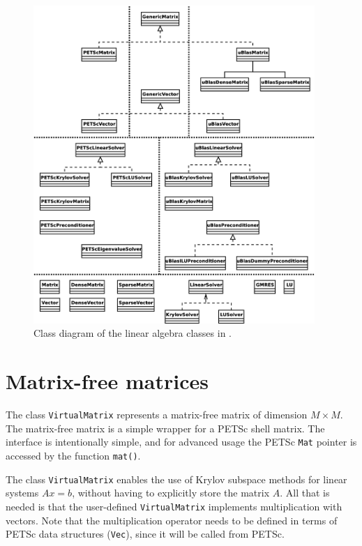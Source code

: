 \begin{figure}
  \begin{center}
    \includegraphics[width=0.95\textwidth]{eps/class-diagram-la.eps}
    \caption{Class diagram of the linear algebra classes in \dolfin{}.}
    \label{fig:laclasses}
  \end{center}
\end{figure}

\section{Matrix-free matrices}

The \dolfin{} class \texttt{VirtualMatrix} represents a matrix-free 
matrix of dimension $M\times M$. 
The matrix-free matrix is a simple wrapper for a PETSc shell matrix. 
The interface is intentionally simple, and for advanced usage the 
PETSc \texttt{Mat} pointer is accessed by the function \texttt{mat()}.  

The class \texttt{VirtualMatrix} enables the use of Krylov subspace
methods for linear systems $Ax = b$, without having to explicitly
store the matrix $A$. All that is needed is that the user-defined
\texttt{VirtualMatrix} implements multiplication with vectors. 
Note that the multiplication operator needs to be defined in terms of
PETSc data structures (\texttt{Vec}), since it will be called from PETSc.

